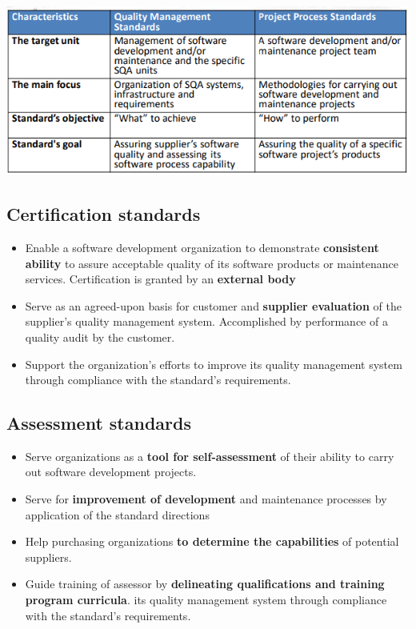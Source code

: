 \documentclass{article}
\begin{document}
\begin{center}
  \includegraphics[scale=0.8]{sqa_classes.png}
\end{center}

\subsection{Certification standards}
\begin{itemize}
  \item Enable a software development organization to demonstrate \textbf{consistent ability} to assure acceptable quality of its software products or maintenance services. Certification is granted by an \textbf{external body}
  \item Serve as an agreed-upon basis for customer and \textbf{supplier evaluation} of the supplier’s quality management system. Accomplished by performance of a quality audit by the customer.
  \item Support the organization's efforts to improve its quality management system through compliance with the standard’s requirements.
\end{itemize}

\subsection{Assessment standards}

\begin{itemize}
  \item Serve organizations as a \textbf{tool for self-assessment} of their ability to carry out software development projects.
  \item Serve for \textbf{improvement of development} and maintenance processes by application of the standard directions
  \item Help purchasing organizations \textbf{to determine the capabilities} of potential suppliers.
  \item Guide training of assessor by \textbf{delineating qualifications and training program curricula}. its quality management system through compliance with the standard’s requirements.
\end{itemize}
\end{document}
